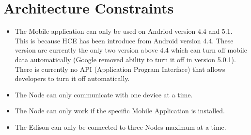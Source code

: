 \section{Architecture Constraints}
	\begin{itemize}
		\item The Mobile application can only be used on Andriod version 4.4 and 5.1. This is because HCE has been introduce from Android version 4.4. These version are currently the only two version above 4.4 which can turn off mobile data automatically (Google removed ability to turn it off in version 5.0.1). There is currently no API (Application Program Interface) that allows developers to turn it off automatically.
		\item The Node can only communicate with one device at a time.
		\item The Node can only work if the specific Mobile Application is installed.
		\item The Edison can only be connected to three Nodes maximum at a time.

	\end{itemize}